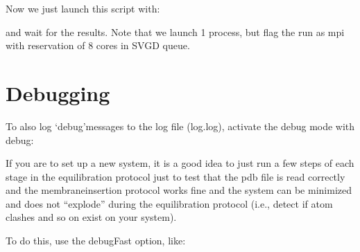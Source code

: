 \documentclass[letterpaper,10pt,english]{sphinxmanual}
\begin{document}
\sphinxAtStartPar
Now we just launch this script with:

\begin{sphinxVerbatim}[commandchars=\\\{\}]
      
\end{sphinxVerbatim}

\sphinxAtStartPar
and wait for the results. Note that we launch 1 process, but flag the
run as mpi with reservation of 8 cores in SVGD queue.


\section{Debugging}
\label{\detokenize{manual:debugging}}
\sphinxAtStartPar
To also log ‘debug’\sphinxhyphen{}messages to the log file (log.log), activate the
debug mode with \textendash{}debug:

\begin{sphinxVerbatim}[commandchars=\\\{\}]
   
\end{sphinxVerbatim}

\sphinxAtStartPar
If you are to set up a new system, it is a good idea to just run a few
steps of each stage in the equilibration protocol just to test that the
pdb file is read correctly and the membrane\sphinxhyphen{}insertion protocol works
fine and the system can be minimized and does not “explode” during the
equilibration protocol (i.e., detect if atom clashes and so on exist on
your system).

\sphinxAtStartPar
To do this, use the \textendash{}debugFast option, like:

\begin{sphinxVerbatim}[commandchars=\\\{\}]
       
\end{sphinxVerbatim}
\end{document}
